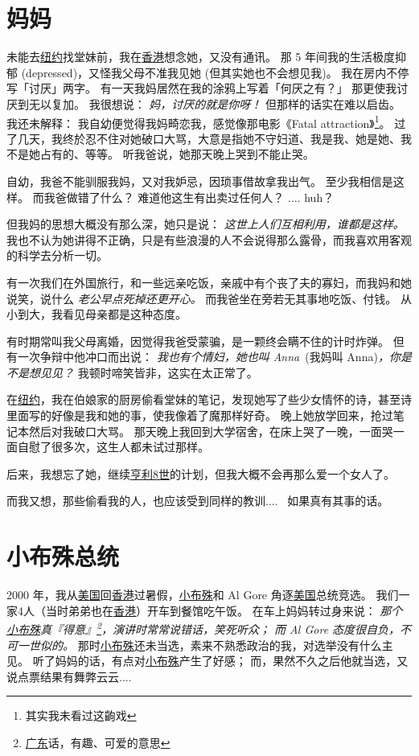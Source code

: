 \documentclass[12pt]{report}
\newcommand{\speechCn}[1]{\textrm{\textit{\textcolor{Speech}{#1}}}}
\begin{document}
\chapter{妈妈}

未能去\uline{纽约}找堂妹前，我在\uline{香港}想念她，又没有通讯。 那 5 年间我的生活极度抑郁 (depressed)，又怪我父母不准我见她 (但其实她也不会想见我)。 我在房内不停写「讨厌」两字。 有一天我妈居然在我的涂鸦上写着「何厌之有？」 那更使我讨厌到无以复加。 我很想说： \speechCn{妈，讨厌的就是你呀！}  但那样的话实在难以启齿。 我还未解释： 我自幼便觉得我妈畸恋我，感觉像那电影《Fatal attraction》\footnote{其实我未看过这齣戏}。 过了几天，我终於忍不住对她破口大骂，大意是指她不守妇道、我是我、她是她、我不是她占有的、等等。 听我爸说，她那天晚上哭到不能止哭。

自幼，我爸不能驯服我妈，又对我妒忌，因琐事借故拿我出气。 至少我相信是这样。 而我爸做错了什么？ 难道他这生有出卖过任何人？ .... huh？

但我妈的思想大概没有那么深，她只是说： \speechCn{这世上人们互相利用，谁都是这样。}  我也不认为她讲得不正确，只是有些浪漫的人不会说得那么露骨，而我喜欢用客观的科学去分析一切。

有一次我们在外国旅行，和一些远亲吃饭，亲戚中有个丧了夫的寡妇，而我妈和她说笑，说什么 \speechCn{老公早点死掉还更开心。}  而我爸坐在旁若无其事地吃饭、付钱。 从小到大，我看见母亲都是这种态度。

有时期常叫我父母离婚，因觉得我爸受蒙骗，是一颗终会瞒不住的计时炸弹。 但有一次争辩中他冲口而出说： \speechCn{我也有个情妇，她也叫 Anna}\ (我妈叫 Anna)\speechCn{，你是不是想见见？}  我顿时啼笑皆非，这实在太正常了。

在\uline{纽约}，我在伯娘家的厨房偷看堂妹的笔记，发现她写了些少女情怀的诗，甚至诗里面写的好像是我和她的事，使我像着了魔那样好奇。 晚上她放学回来，抢过笔记本然后对我破口大骂。 那天晚上我回到大学宿舍，在床上哭了一晚，一面哭一面自慰了很多次，这生人都未试过那样。

后来，我想忘了她，继续\uline{亨利8世}的计划，但我大概不会再那么爱一个女人了。

而我又想，那些偷看我的人，也应该受到同样的教训....~ 如果真有其事的话。

\chapter{小布殊总统}

2000 年，我从\uline{美国}回\uline{香港}过暑假，\uline{小布殊}和 Al Gore 角逐\uline{美国}总统竞选。  我们一家4人（当时弟弟也在\uline{香港}）开车到餐馆吃午饭。  在车上妈妈转过身来说： \speechCn{那个\uline{小布殊}真『得意』\footnote{\uline{广东}话，有趣、可爱的意思}，演讲时常常说错话，笑死听众； 而 Al Gore 态度很自负，不可一世似的。}  那时\uline{小布殊}还未当选，素来不熟悉政治的我，对选举没有什么主见。 听了妈妈的话，有点对\uline{小布殊}产生了好感； 而，果然不久之后他就当选，又说点票结果有舞弊云云....
\end{document}
